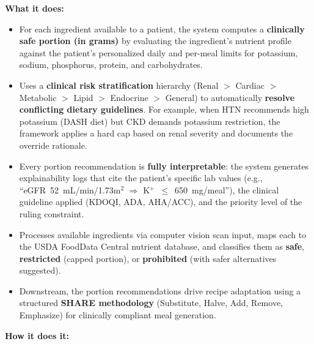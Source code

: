 \documentclass[a4paper,12pt]{article}
\begin{document}
\medskip
\noindent\textbf{What it does:}
\begin{itemize}[itemsep=0.3em]
    \item For each ingredient available to a patient, the system computes a \textbf{clinically safe portion (in grams)} by evaluating the ingredient's nutrient profile against the patient's personalized daily and per-meal limits for potassium, sodium, phosphorus, protein, and carbohydrates.
    \item Uses a \textbf{clinical risk stratification} hierarchy (Renal $>$ Cardiac $>$ Metabolic $>$ Lipid $>$ Endocrine $>$ General) to automatically \textbf{resolve conflicting dietary guidelines}. For example, when HTN recommends high potassium (DASH diet) but CKD demands potassium restriction, the framework applies a hard cap based on renal severity and documents the override rationale.
    \item Every portion recommendation is \textbf{fully interpretable}: the system generates explainability logs that cite the patient's specific lab values (e.g., ``eGFR~52~mL/min/1.73m$^2$ $\Rightarrow$ K$^+$~$\leq$~650~mg/meal''), the clinical guideline applied (KDOQI, ADA, AHA/ACC), and the priority level of the ruling constraint.
    \item Processes available ingredients via computer vision scan input, maps each to the USDA FoodData Central nutrient database, and classifies them as \textbf{safe}, \textbf{restricted} (capped portion), or \textbf{prohibited} (with safer alternatives suggested).
    \item Downstream, the portion recommendations drive recipe adaptation using a structured \textbf{SHARE methodology} (Substitute, Halve, Add, Remove, Emphasize) for clinically compliant meal generation.
\end{itemize}

\medskip
\noindent\textbf{How it does it:}
\end{document}
